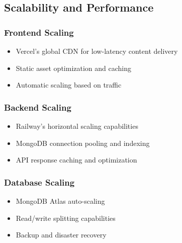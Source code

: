 \subsection{Scalability and Performance}

\subsubsection{Frontend Scaling}
\begin{itemize}
\item Vercel's global CDN for low-latency content delivery
\item Static asset optimization and caching
\item Automatic scaling based on traffic
\end{itemize}

\subsubsection{Backend Scaling}
\begin{itemize}
\item Railway's horizontal scaling capabilities
\item MongoDB connection pooling and indexing
\item API response caching and optimization
\end{itemize}

\subsubsection{Database Scaling}
\begin{itemize}
\item MongoDB Atlas auto-scaling
\item Read/write splitting capabilities
\item Backup and disaster recovery
\end{itemize}